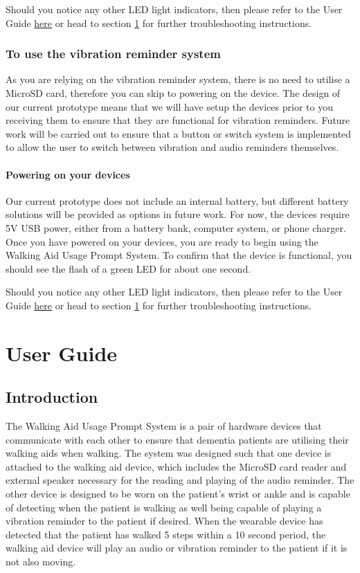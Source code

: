 				Should you notice any other LED light indicators, then please refer to the User Guide \hyperref[sec:user_guide]{here} or head to section \ref{sec:user_guide} for further troubleshooting instructions.

				\subsubsection{To use the vibration reminder system}

				As you are relying on the vibration reminder system, there is no need to utilise a MicroSD card, therefore you can skip to powering on the device. The design of our current prototype means that we will have setup the devices prior to you receiving them to ensure that they are functional for vibration reminders. Future work will be carried out to ensure that a button or switch system is implemented to allow the user to switch between vibration and audio reminders themselves.

				\paragraph{Powering on your devices}\mbox{}

				Our current prototype does not include an internal battery, but different battery solutions will be provided as options in future work. For now, the devices require 5V USB power, either from a battery bank, computer system, or phone charger. Once you have powered on your devices, you are ready to begin using the Walking Aid Usage Prompt System. To confirm that the device is functional, you should see the flash of a green LED for about one second.

				Should you notice any other LED light indicators, then please refer to the User Guide \hyperref[sec:user_guide]{here} or head to section \ref{sec:user_guide} for further troubleshooting instructions.


	\section{User Guide}
	\label{sec:user_guide}

		\subsection{Introduction}

			The Walking Aid Usage Prompt System is a pair of hardware devices that communicate with each other to ensure that dementia patients are utilising their walking aids when walking. The system was designed such that one device is attached to the walking aid device, which includes the MicroSD card reader and external speaker necessary for the reading and playing of the audio reminder. The other device is designed to be worn on the patient's wrist or ankle and is capable of detecting when the patient is walking as well being capable of playing a vibration reminder to the patient if desired. When the wearable device has detected that the patient has walked 5 steps within a 10 second period, the walking aid device will play an audio or vibration reminder to the patient if it is not also moving. 

